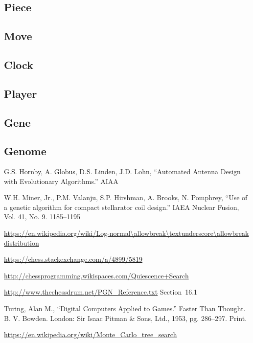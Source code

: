 \documentclass[letterpaper]{article}
\renewcommand{\_}{\allowbreak\textunderscore\allowbreak}
\begin{document}
\subsection{Piece}

\subsection{Move}

\subsection{Clock}

\subsection{Player}

\subsection{Gene}

\subsection{Genome}



\begin{thebibliography}{9}

G.S. Hornby, A. Globus, D.S. Linden, J.D. Lohn, ``Automated Antenna Design with Evolutionary Algorithms.'' AIAA

W.H. Miner, Jr., P.M. Valanju, S.P. Hirshman, A. Brooks, N. Pomphrey, ``Use of a genetic algorithm for compact stellarator coil design.'' IAEA Nuclear Fusion, Vol. 41, No. 9. 1185--1195

\url{https://en.wikipedia.org/wiki/Log-normal\_distribution}

\url{https://chess.stackexchange.com/a/4899/5819}

\url{http://chessprogramming.wikispaces.com/Quiescence+Search}

\url{http://www.thechessdrum.net/PGN_Reference.txt} Section~16.1

Turing, Alan M., ``Digital Computers Applied to Games.'' Faster Than Thought. B. V. Bowden. London: Sir Isaac Pitman \& Sons, Ltd., 1953, pg. 286--297. Print.

\url{https://en.wikipedia.org/wiki/Monte_Carlo_tree_search}

\end{thebibliography}
\end{document}
